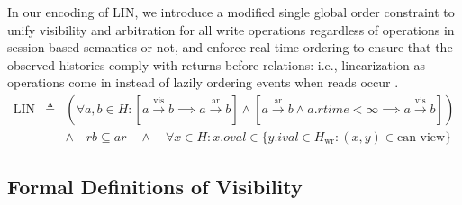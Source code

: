    In our encoding of LIN,
  we introduce a modified single global order constraint to unify visibility and
  arbitration for all write operations regardless of operations in
  session-based semantics or not, and enforce real-time ordering to
  ensure that the observed histories comply with returns-before relations:
  i.e., linearization as operations come in instead of lazily ordering
  events when
  reads occur \cite{zhang2018building}.
  \begin{eqnarray*}
    \text{LIN} & \triangleq & (\forall a, b \in H: [a
      \xrightarrow{\text{vis}} b \implies a \xrightarrow{\text{ar}} b] \land  [a \xrightarrow{\text{ar}} b \land a.rtime < \infty \implies
    a \xrightarrow{\text{vis}} b]) \\
    & & \land \quad rb \subseteq ar \quad \land \quad \forall x \in H: x.oval \in \{y.ival \in H_\text{wr} : (x,
    y) \in \text{can-view}\}
  \end{eqnarray*}


  \subsection{Formal Definitions of Visibility}
  \label{subsec:vis}

